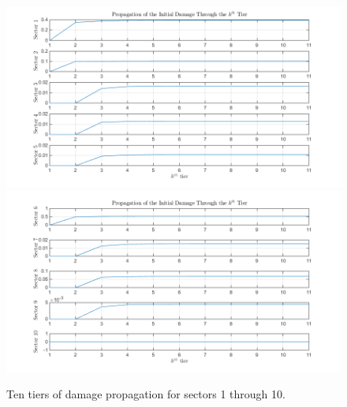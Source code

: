 \documentclass[11pt,a4paper]{article}
\begin{document}
\begin{figure}[H]
	\centering
	\includegraphics[width=1\textwidth]
    {damage_propagation_1_5.png}
	\includegraphics[width=1\textwidth]
    {damage_propagation_6_10.png}
    \caption{Ten tiers of damage propagation for sectors 1 through 10.}
    \label{fig: Damage Propagation 1-10}
\end{figure}
\end{document}
